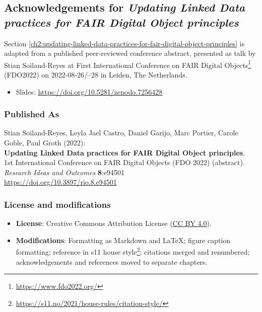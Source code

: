 
\subsection{Acknowledgements for \textit{Updating Linked Data practices for FAIR Digital Object principles}}


Section \ref{ch2:updating-linked-data-practices-for-fair-digital-object-principles} is adapted from a published peer-reviewed conference abstract,
presented as talk by Stian Soiland-Reyes at 
First International Conference on FAIR Digital Objects\footnote{\url{https://www.fdo2022.org/}} 
(FDO2022) on
2022-08-26/--28 in Leiden, The Netherlands. 


\begin{itemize}
    \item Slides: \url{https://doi.org/10.5281/zenodo.7256428}
\end{itemize}

\subsubsection*{Published As}

Stian Soiland-Reyes, Leyla Jael Castro, Daniel Garijo, Marc Portier, Carole Goble, Paul Groth (2022):\\
\textbf{Updating Linked Data practices for FAIR Digital Object principles}.\\
1st International Conference on FAIR Digital Objects (FDO 2022) (abstract).\\
\textit{Research Ideas and Outcomes} \textbf{8}:e94501\\
\url{https://doi.org/10.3897/rio.8.e94501}


\subsubsection*{License and modifications}

\begin{itemize}
\tightlist
\item
  \textbf{License}: Creative Commons Attribution License
  (\href{https://spdx.org/licenses/CC-BY-4.0}{CC BY 4.0}).
\item
  \textbf{Modifications}: Formatting as Markdown and LaTeX; figure caption
		formatting; reference in s11 house style\footnote{\url{https://s11.no/2021/house-rules/citation-style/}}; citations merged and renumbered; 
  acknowledgements and references moved to separate chapters.
\end{itemize}

